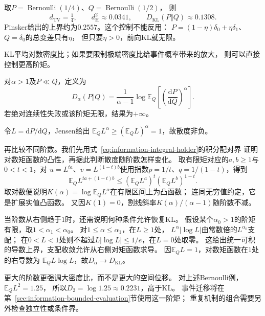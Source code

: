 取\(P=\operatorname{Bernoulli}(1/4)\)、\(Q=\operatorname{Bernoulli}(1/2)\)，
则
\[
  d_{\mathrm{TV}}=\tfrac14,\qquad
  d_{\mathrm H}^2\approx0.0341,\qquad
  D_{\mathrm{KL}}(P\Vert Q)\approx0.1308.
\]
Pinsker给出的上界约为\(0.2557\)。这个控制不能反用：
\(P=(1-\eta)\delta_0+\eta\delta_1\)、\(Q=\delta_0\)的总变差只有\(\eta\)，
但只要\(\eta>0\)，前向KL就无限。

KL平均对数密度比；如果要限制极端密度比给事件概率带来的放大，
则可以直接控制更高阶矩。

\begin{definition}[高于一阶的Rényi散度]
\label{def:information-renyi-divergence}
对\(\alpha>1\)及\(P\ll Q\)，定义为
\begin{equation}
  D_\alpha(P\Vert Q)
   =\frac1{\alpha-1}\log\mathbb E_Q
       \left[\left(\frac{\mathrm dP}{\mathrm dQ}\right)^\alpha\right].
  \label{eq:information-renyi-divergence}
\end{equation}
若绝对连续性失败或该阶矩无限，结果为\(+\infty\)。
\end{definition}

令\(L=\mathrm dP/\mathrm dQ\)，Jensen给出
\(\mathbb E_Q L^\alpha\geq(\mathbb E_QL)^\alpha=1\)，故散度非负。

再比较不同阶数。我们先用式~\eqref{eq:information-integral-holder}的积分配对界
证明对数矩函数的凸性，再据此判断散度随阶数怎样变化。
取有限矩对应的\(a,b\geq1\)与\(0<t<1\)，对
\(u=L^{ta}\)、\(v=L^{(1-t)b}\)使用指数\(p=1/t\)、\(q=1/(1-t)\)，得到
\[
 \mathbb E_Q L^{ta+(1-t)b}
 \leq(\mathbb E_Q L^a)^t(\mathbb E_Q L^b)^{1-t}.
\]
取对数便说明\(K(\alpha)=\log\mathbb E_QL^\alpha\)在有限区间上为凸函数；
连同无穷值约定，它是扩展实值凸函数。
又因\(K(1)=0\)，割线斜率\(K(\alpha)/(\alpha-1)\)随阶数不减。

当阶数从右侧趋于\(1\)时，还需说明何种条件允许恢复KL。
假设某个\(\alpha_0>1\)的阶矩有限，取\(1<\alpha_1<\alpha_0\)。
对\(1\leq\alpha\leq\alpha_1\)，在\(L\geq1\)处，
\(L^\alpha|\log L|\)由常数倍的\(L^{\alpha_0}\)支配；
在\(0<L<1\)处则不超过\(L|\log L|\leq1/e\)，在\(L=0\)处取零。
这给出统一可积的导数上界，支配收敛允许从右侧对矩函数求导。
因\(\mathbb E_Q L=1\)，对数矩函数在\(1\)处的右导数为
\(\mathbb E_Q L\log L\)，故\(D_\alpha\to D_{\mathrm{KL}}\)。

更大的阶数更强调大密度比，而不是更大的空间位移。
对上述Bernoulli例，\(\mathbb E_QL^2=1.25\)，
所以\(D_2=\log1.25\approx0.2231\)，高于KL。
事件迁移将在第~\ref{sec:information-bounded-evaluation}节使用这一阶矩；
重复机制的组合需要另外检查独立性或条件界。

